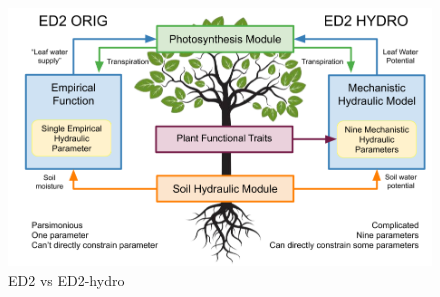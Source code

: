 \begin{figure}[!h]
    \centering
    \includegraphics[width=.75\textwidth]{Hydro_Paper_LaTeX/Hydro_Paper_Figures/ED_versions.png}
    \caption[ED2 versions]{ED2 vs ED2-hydro}
    \label{fig:ED_versions}
\end{figure}